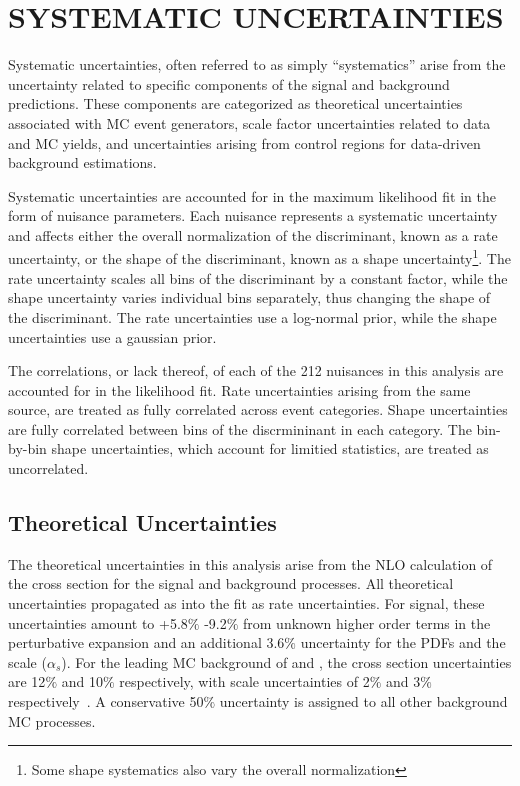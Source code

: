 %
%

\chapter{SYSTEMATIC UNCERTAINTIES}
Systematic uncertainties, often referred to as simply ``systematics'' arise from the uncertainty related to specific components of the signal
and background predictions. These components are categorized as theoretical uncertainties associated with MC event generators, scale factor uncertainties
related to data and MC yields, and uncertainties arising from control regions for data-driven background estimations.  

Systematic uncertainties are accounted for in the maximum likelihood fit in the form of nuisance parameters. Each nuisance represents a systematic uncertainty
and affects either the overall normalization of the discriminant, known as a rate uncertainty, or the shape of the discriminant,
known as a shape uncertainty\footnote{Some shape systematics also vary the overall normalization}. The rate uncertainty scales all bins of the discriminant
by a constant factor, while the shape uncertainty varies individual bins separately, thus changing the shape of the discriminant.
The rate uncertainties use a log-normal prior, while the shape uncertainties use a gaussian prior. 

The correlations, or lack thereof, of each of the 212 nuisances in this analysis are accounted for in the likelihood fit. 
Rate uncertainties arising from the same source, are treated as fully correlated across event categories. Shape uncertainties are fully correlated between
bins of the discrmininant in each category. The bin-by-bin shape uncertainties, which account for limitied statistics, are treated as uncorrelated. 


\section{Theoretical Uncertainties}
The theoretical uncertainties in this analysis arise from the NLO calculation of the cross section for the signal and background processes.
All theoretical uncertainties propagated as into the fit as rate uncertainties. For \tth signal,
these uncertainties amount to +5.8$\%$ -9.2$\%$ from unknown higher order terms in the perturbative expansion and an additional 3.6$\%$ uncertainty for the
PDFs and the scale ($\alpha_{s}$). For the leading MC background of \ttw and \ttz, the cross section uncertainties are 12$\%$ and 10$\%$ respectively, with
scale uncertainties of 2$\%$ and 3$\%$ respectively~\cite{xsec_uncert}. A conservative 50$\%$ uncertainty is assigned to all other background MC processes. 


